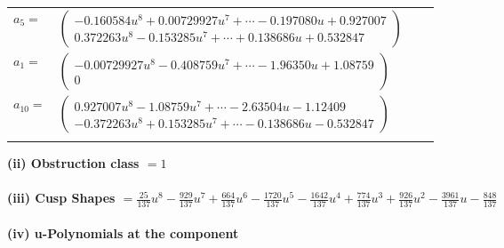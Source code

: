 \documentclass[1p]{elsarticle_modified}
\theoremstyle{definition}
\begin{document}
\begin{tabular}{m{7pt} m{180pt} m{7pt} m{180pt} }
\flushright $a_{5}=$&$\begin{pmatrix}-0.160584 u^{8}+0.00729927 u^{7}+\cdots-0.197080 u+0.927007\\0.372263 u^{8}-0.153285 u^{7}+\cdots+0.138686 u+0.532847\end{pmatrix}$ \\
\flushright $a_{1}=$&$\begin{pmatrix}-0.00729927 u^{8}-0.408759 u^{7}+\cdots-1.96350 u+1.08759\\0\end{pmatrix}$ \\
\flushright $a_{10}=$&$\begin{pmatrix}0.927007 u^{8}-1.08759 u^{7}+\cdots-2.63504 u-1.12409\\-0.372263 u^{8}+0.153285 u^{7}+\cdots-0.138686 u-0.532847\end{pmatrix}$\\&\end{tabular}
\flushleft \textbf{(ii) Obstruction class $= 1$}\\~\\
\flushleft \textbf{(iii) Cusp Shapes $= \frac{25}{137} u^8-\frac{929}{137} u^7+\frac{664}{137} u^6-\frac{1720}{137} u^5-\frac{1642}{137} u^4+\frac{774}{137} u^3+\frac{926}{137} u^2-\frac{3961}{137} u-\frac{848}{137}$}\\~\\
\newpage\renewcommand{\arraystretch}{1}
\flushleft \textbf{(iv) u-Polynomials at the component}\newline \\
\end{document}
